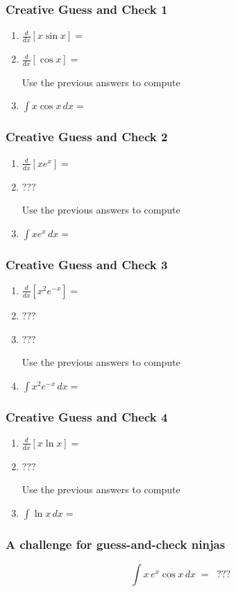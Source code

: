 \documentclass[14pt]{beamer}
\begin{document}
	\begin{frame}[t]
		\frametitle{Creative Guess and Check 1}

		\begin{enumerate}
			\item $\displaystyle \frac{d}{dx}[x\sin x]=$
			\item $\displaystyle \frac{d}{dx}[\cos x]=$

				\bigskip
				\bigskip
			Use the previous answers to compute

			\item $\displaystyle \int x\cos x\,d x=$
		\end{enumerate}
	\end{frame}
	\begin{frame}[t]
		\frametitle{Creative Guess and Check 2}

		\begin{enumerate}
			\item $\displaystyle \frac{d}{dx}[x e^x]=$
			\item $\displaystyle ???$

				\bigskip
				\bigskip
			Use the previous answers to compute

			\item $\displaystyle \int x e^x\,d x=$
		\end{enumerate}
	\end{frame}
	\begin{frame}[t]
		\frametitle{Creative Guess and Check 3}

		\begin{enumerate}
			\item $\displaystyle \frac{d}{dx}[x^2 e^{-x}]=$
			\item $\displaystyle ???$
			\item $\displaystyle ???$

				\bigskip
				\bigskip
			Use the previous answers to compute

			\item $\displaystyle \int x^2 e^{-x}\,d x=$
		\end{enumerate}
	\end{frame}

	\begin{frame}[t]
		\frametitle{Creative Guess and Check 4}

		\begin{enumerate}
			\item $\displaystyle \frac{d}{dx}[x \ln x]=$
			\item $\displaystyle ???$

				\bigskip
				\bigskip
			Use the previous answers to compute

			\item $\displaystyle \int \ln x\,d x=$
		\end{enumerate}
	\end{frame}
	\begin{frame}[t]
		\frametitle{A challenge for guess-and-check ninjas}
		\[
			\int x \, e^{x} \cos x \, dx \; = \; \; ???
		\]
	\end{frame}
\end{document}
